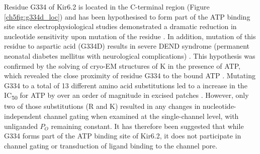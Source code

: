 Residue G334 of Kir6.2 is located in the C-terminal region (Figure \ref{ch5fig:g334d_loc}) and has been hypothesised to form part of the ATP binding site since electrophysiological studies demonstrated a dramatic reduction in nucleotide sensitivity upon mutation of the residue \cite{drain_katp_1998, li_open_2002, li_ligand-dependent_2005}.
In addition, mutation of this residue to aspartic acid (G334D) results in severe DEND syndrome (permanent neonatal diabetes mellitus with neurological complications) \cite{masia_atp-binding_2007-1}.
This hypothesis was confirmed by the solving of cryo-EM structures of K\ATP{} in the presence of ATP, which revealed the close proximity of residue G334 to the bound ATP \cite{lee_molecular_2017, martin_anti-diabetic_2017, li_structure_2017, puljung_cryo-electron_2018-1}.
Mutating G334 to a total of 13 different amino acid substitutions led to a increase in the IC\textsubscript{50} for ATP by over an order of magnitude in excised patches \cite{li_ligand-dependent_2005}.
However, only two of those substitutions (R and K) resulted in any changes in nucleotide-independent channel gating when examined at the single-channel level, with unliganded $P_O$ remaining constant.
It has therefore been suggested that while G334 forms part of the ATP binding site of Kir6.2, it does not participate in channel gating or transduction of ligand binding to the channel pore.

